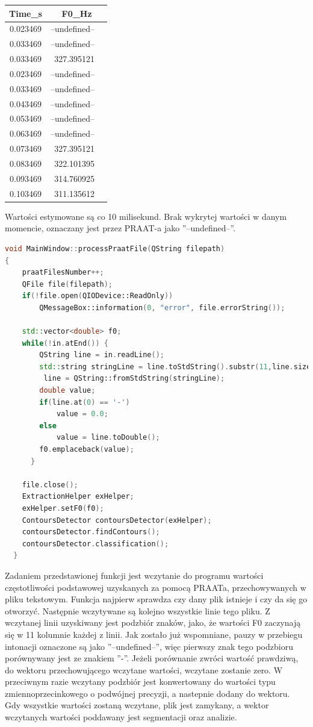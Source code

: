 \documentclass[a4paper,12 pt]{report}
\begin{document}
\begin{tabular}{c r @{} l}
Time\_s &
\multicolumn{2}{c}{F0\_Hz}\\ \hline
0.023469 & --undefined-- \\
0.033469 & --undefined-- \\
0.033469 & 327.395121 \\
0.023469 &  --undefined-- \\
0.033469 &  --undefined-- \\
0.043469 &  --undefined-- \\
0.053469 &  --undefined-- \\
0.063469 &  --undefined-- \\
0.073469 &  327.395121 \\
0.083469 &  322.101395 \\
0.093469 &  314.760925 \\
0.103469 &  311.135612 \\
\end{tabular}



Wartości estymowane są co 10 milisekund. Brak wykrytej wartości w danym momencie, oznaczany jest przez PRAAT-a jako ''--undefined--''.
\begin{lstlisting}[caption={Funkcja wczytująca do programu wartości F0 z pliku tekstowego},label={lst:label},language=C++]
void MainWindow::processPraatFile(QString filepath)
{
    praatFilesNumber++;
    QFile file(filepath);
    if(!file.open(QIODevice::ReadOnly)) 
        QMessageBox::information(0, "error", file.errorString());

    std::vector<double> f0;
    while(!in.atEnd()) {
        QString line = in.readLine();
        std::string stringLine = line.toStdString().substr(11,line.size());
         line = QString::fromStdString(stringLine);
        double value;
        if(line.at(0) == '-')
            value = 0.0;
        else
            value = line.toDouble();
        f0.emplaceback(value);
      }

    file.close();
    ExtractionHelper exHelper;
    exHelper.setF0(f0);
    ContoursDetector contoursDetector(exHelper);
    contoursDetector.findContours();
    contoursDetector.classification();
  }
\end{lstlisting}
Zadaniem przedstawionej funkcji jest wczytanie do programu wartości częstotliwości podstawowej uzyskanych za pomocą PRAATa, przechowywanych w pliku tekstowym. Funkcja najpierw sprawdza czy dany plik istnieje i czy da się go otworzyć. Następnie wczytywane są kolejno wszystkie linie tego pliku. Z wczytanej linii uzyskiwany jest podzbiór znaków, jako, że wartości F0 zaczynają się w 11 kolumnie każdej z linii. Jak zostało już wspomniane, pauzy w przebiegu intonacji oznaczone są jako ''--undefined--'', więc pierwszy znak tego podzbioru porównywany jest ze znakiem ''-''. Jeżeli porównanie zwróci wartość prawdziwą, do wektoru przechowującego wczytane wartości, wczytane zostanie zero. W przeciwnym razie wczytany podzbiór jest konwertowany do wartości typu zmiennoprzecinkowego o podwójnej precyzji, a nastepnie dodany do wektoru. Gdy wszystkie wartości zostaną wczytane, plik jest zamykany, a wektor wczytanych wartości poddawany jest segmentacji oraz analizie.
\end{document}
